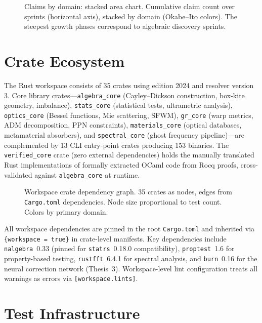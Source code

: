 \documentclass[12pt,openany]{report}
\theoremstyle{definition}
\theoremstyle{plain}
\theoremstyle{remark}
\newcommand{\cratecount}{35}
\begin{document}
\begin{figure}[htbp]
\centering

\caption{Claims by domain: stacked area chart.  Cumulative claim count
over sprints (horizontal axis), stacked by domain (Okabe--Ito colors).
The steepest growth phases correspond to algebraic discovery sprints.}
\label{fig:claims-domain}
\end{figure}

\section{Crate Ecosystem}

The Rust workspace consists of \cratecount{} crates using edition 2024
and resolver version 3.  Core library crates---\texttt{algebra\_core}
(Cayley--Dickson construction, box-kite geometry, imbalance),
\texttt{stats\_core} (statistical tests, ultrametric analysis),
\texttt{optics\_core} (Bessel functions, Mie scattering, SFWM),
\texttt{gr\_core} (warp metrics, ADM decomposition, PPN constraints),
\texttt{materials\_core} (optical databases, metamaterial absorbers),
and \texttt{spectral\_core} (ghost frequency pipeline)---are complemented
by 13 CLI entry-point crates producing 153 binaries.  The
\texttt{verified\_core} crate (zero external dependencies) holds the
manually translated Rust implementations of formally extracted OCaml
code from Rocq proofs, cross-validated against \texttt{algebra\_core}
at runtime.

\begin{figure}[htbp]
\centering

\caption{Workspace crate dependency graph.  \cratecount{} crates as
nodes, edges from \texttt{Cargo.toml} dependencies.  Node size
proportional to test count.  Colors by primary domain.}
\label{fig:crate-graph}
\end{figure}

All workspace dependencies are pinned in the root \texttt{Cargo.toml}
and inherited via \texttt{\{workspace = true\}} in crate-level
manifests.  Key dependencies include \texttt{nalgebra}~0.33 (pinned
for \texttt{statrs}~0.18.0 compatibility), \texttt{proptest}~1.6 for
property-based testing, \texttt{rustfft}~6.4.1 for spectral analysis,
and \texttt{burn}~0.16 for the neural correction network (Thesis~3).
Workspace-level lint configuration treats all warnings as errors via
\texttt{[workspace.lints]}.

\section{Test Infrastructure}
\end{document}
